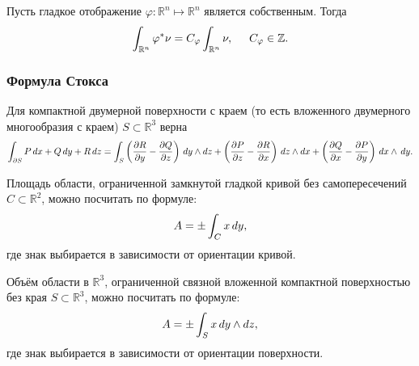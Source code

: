 \begin{to_tas}
    \label{task_6.108}
    Пусть гладкое отображение $\varphi \colon \mathbb{R}^n \mapsto \mathbb{R}^n$ является собственным. Тогда
    \begin{equation*}
        \int_{\mathbb{R}^n}\varphi^* \nu = C_\varphi \int_{\mathbb{R}^n} \nu, \hspace{0.5cm} 
        C_\varphi \in \mathbb{Z}.
    \end{equation*}
\end{to_tas}

\subsubsection*{Формула Стокса}


\begin{to_lem}
     Для компактной двумерной поверхности с краем (то есть вложенного двумерного многообразия с краем) $S \subset \mathbb{R}^3$ верна
\begin{equation*}
    \int_{\partial S} P \, d x + Q \, d y + R \, d z =
    \int_S \left(\frac{\partial R}{\partial y} - \frac{\partial Q}{\partial z} \right) \, d y \wedge d z + 
    \left(\frac{\partial P}{\partial z} - \frac{\partial R}{\partial x} \right) \, d z \wedge dx + 
    \left(\frac{\partial Q}{\partial x} - \frac{\partial P}{\partial y} \right) \, d x \wedge \, d y.
\end{equation*}
\end{to_lem}


\begin{to_tas} 
    Площадь области, ограниченной замкнутой гладкой кривой без самопересечений $C \subset \mathbb{R}^2$, можно посчитать по формуле:
    \begin{equation*}
         A = \pm \int_C x \, d y,
     \end{equation*} 
    где знак выбирается в зависимости от ориентации кривой.
\end{to_tas}

\begin{to_tas} 
    Объём области в $\mathbb{R}^3$, ограниченной связной вложенной компактной поверхностью без края $S \subset \mathbb{R}^3$, можно посчитать по формуле:
    \begin{equation*}
         A = \pm \int_S x \, d y \wedge d z,
     \end{equation*} 
    где знак выбирается в зависимости от ориентации поверхности.
\end{to_tas}




